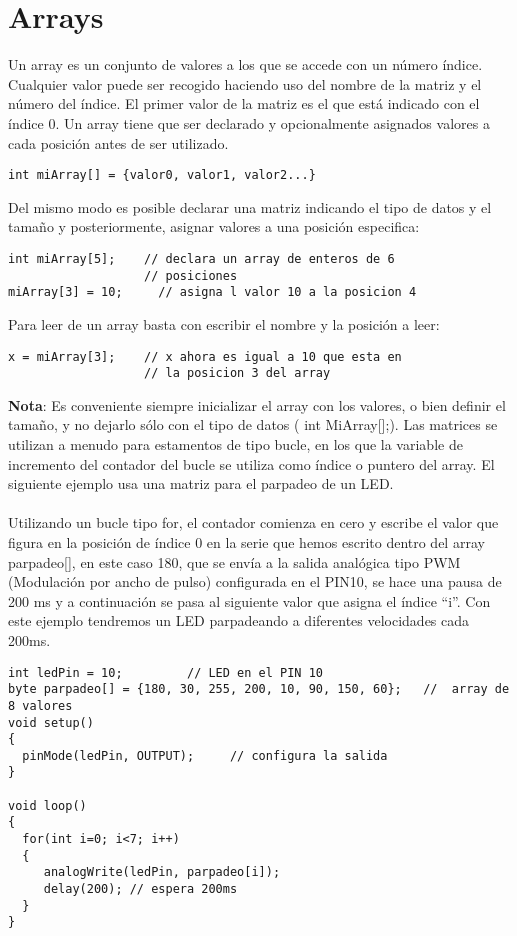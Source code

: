 \section{Arrays}

Un array es un conjunto de valores a los que se accede con un número índice. Cualquier valor puede ser recogido haciendo uso del nombre de la matriz y el número del índice. El primer valor de la matriz es el que está indicado con el índice 0. Un array tiene que ser declarado y opcionalmente asignados valores a cada posición antes de ser utilizado.
\begin{lstlisting}
int miArray[] = {valor0, valor1, valor2...}
\end{lstlisting}
Del mismo modo es posible declarar una matriz indicando el tipo de datos y el tamaño y posteriormente, asignar valores a una posición especifica:
\begin{lstlisting}
int miArray[5];    // declara un array de enteros de 6
                   // posiciones
miArray[3] = 10;     // asigna l valor 10 a la posicion 4
\end{lstlisting}
Para leer de un array basta con escribir el nombre y la posición a leer:
\begin{lstlisting}
x = miArray[3];    // x ahora es igual a 10 que esta en
                   // la posicion 3 del array
\end{lstlisting}
\textbf{Nota}: Es conveniente siempre inicializar el array con los valores, o bien definir el tamaño, y no dejarlo sólo con el tipo de datos ( int MiArray[];). Las matrices se utilizan a menudo para estamentos de tipo bucle, en los que la variable de incremento del contador del bucle se utiliza como índice o puntero del array. El siguiente ejemplo usa una matriz para el parpadeo de un LED.\\
\\
Utilizando un bucle tipo for, el contador comienza en cero y escribe el valor que figura en la posición de índice 0 en la serie que hemos escrito dentro del array parpadeo[], en este caso 180, que se envía a la salida analógica tipo PWM (Modulación por ancho de pulso) configurada en el PIN10, se hace una pausa de 200 ms y a continuación se pasa al siguiente valor que asigna el índice “i”. Con este ejemplo tendremos un LED parpadeando a diferentes velocidades cada 200ms.
\begin{lstlisting}
int ledPin = 10;         // LED en el PIN 10
byte parpadeo[] = {180, 30, 255, 200, 10, 90, 150, 60};   //  array de 8 valores
void setup()
{
  pinMode(ledPin, OUTPUT);     // configura la salida
}

void loop()            
{
  for(int i=0; i<7; i++)    
  {               
     analogWrite(ledPin, parpadeo[i]);
     delay(200); // espera 200ms
  }
}
\end{lstlisting}